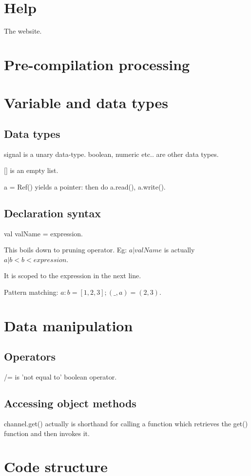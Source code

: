 \section{Help}
The website.

\section{Pre-compilation processing}

\section{Variable and data types}
\subsection{Data types}
signal is a unary data-type. boolean, numeric etc.. are other data types.

[] is an empty list.

a = Ref() yields a pointer: then do a.read(), a.write().

\subsection{Declaration syntax}
val valName = expression.

This boils down to pruning operator. Eg: $a|valName$ is actually $a|b<b<expression$.

It is scoped to the expression in the next line.

Pattern matching: $a:b=[1, 2, 3]; (\_, a) = (2, 3)$.

\section{Data manipulation}
\subsection{Operators}
/= is 'not equal to' boolean operator.

\subsection{Accessing object methods}
channel.get() actually is shorthand for calling a function which retrieves the get() function and then invokes it.

\section{Code structure}
